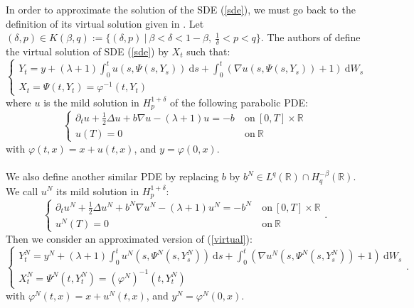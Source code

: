 \documentclass[11pt]{enstaPRE}
\newcommand{\R}{\mathbb{R}}
\newcommand{\di}{\mathrm{d}}
\begin{document}
In order to approximate the solution of the SDE (\ref{sde}), we must go back to the definition of its virtual solution given in \cite{Fla-Iss-Rus-2017}. Let $(\delta,p)\in K(\beta,q):=\{(\delta,p)\ |\ \beta<\delta<1-\beta,\ \frac{1}{\delta}<p<q\}$. The authors of \cite{Fla-Iss-Rus-2017} define the virtual solution of SDE (\ref{sde}) by $X_t$ such that:
\begin{equation}\label{virtual}
\begin{cases}
Y_t = y + (\lambda+1)\int_0^t u(s,\Psi\left(s,Y_s\right))\ \di s +\int_0^t (\nabla u(s,\Psi\left(s,Y_s\right))+1)\ \di W_s \\X_t = \Psi(t,Y_t) = \varphi^{-1}(t,Y_t)
\end{cases}
\end{equation}
where $u$ is the mild solution in $H_p^{1+\delta}$ of the following parabolic PDE:
\begin{equation}\label{pde}
\begin{cases}
\partial_t u + \frac{1}{2}\Delta u + b\nabla u - (\lambda+1)u = -b\ &\mathrm{on}\ [0,T]\times\R\\
u(T) = 0\ &\mathrm{on}\ \R
\end{cases}
\end{equation}
with $\varphi(t,x) = x + u(t,x)$, and $y=\varphi(0,x)$.

\paragraph{}
We also define another similar PDE by replacing $b$ by $b^N\in L^q(\R)\cap H^{-\beta}_q(\R)$. We call $u^N$ its mild solution in $H_p^{1+\delta}$:
\begin{equation}\label{pde2}
\begin{cases}
\partial_t u^N + \frac{1}{2}\Delta u^N + b^N\nabla u^N - (\lambda+1)u^N = -b^N\ &\mathrm{on}\ [0,T]\times\R\\
u^N(T) = 0\ &\mathrm{on}\ \R
\end{cases}.
\end{equation}
Then we consider an approximated version of (\ref{virtual}): \begin{equation}\label{virtual approx}
\begin{cases}
Y_t^N = y^N + (\lambda+1)\int_0^t u^N\left(s,\Psi^N\left(s,Y_s^N\right)\right)\ \di s +\int_0^t \left(\nabla u^N\left(s,\Psi^N\left(s,Y_s^N\right)\right)+1\right)\ \di W_s\\
X_t^N = \Psi^N(t,Y_t^N) = {(\varphi^N)}^{-1}(t,Y_t^N)
\end{cases}.
\end{equation}
with $\varphi^N(t,x) = x + u^N(t,x)$, and $y^N=\varphi^N(0,x)$.
\end{document}

